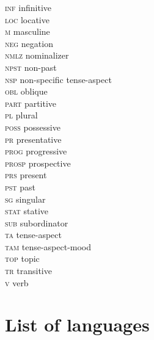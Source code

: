 ﻿\documentclass[output=paper,draft,draftmode,colorlinks,citecolor=brown]{langscibook}
\begin{document}
\begin{multicols}{2}
\begin{tabbing}
\textsc{inf}         \> infinitive\\
\textsc{loc}		 \> locative\\
\textsc{m} 		 \> masculine\\
\textsc{neg}		 \> negation\\
\textsc{nmlz}        \> nominalizer\\
\textsc{npst}        \> non-past\\
\textsc{nsp}         \> non-specific tense-aspect\\
\textsc{obl}		 \> oblique\\
\textsc{part}		 \> partitive\\
\textsc{pl}		 \> plural\\
\textsc{poss}		 \> possessive\\
\textsc{pr}		 \> presentative\\
\textsc{prog}		 \> progressive\\
\textsc{prosp}		 \> prospective\\
\textsc{prs}		 \> present\\
\textsc{pst}	 \> past\\
\textsc{sg}		 \> singular\\
\textsc{stat}		 \> stative\\
\textsc{sub}		 \> subordinator\\
\textsc{ta}		 \> tense-aspect\\
\textsc{tam}		 \> tense-aspect-mood\\
\textsc{top}		 \> topic\\
\textsc{tr}          \> transitive\\
\textsc{v}           \> verb
\end{tabbing}
\end{multicols}

\section*{List of languages}
\end{document}
